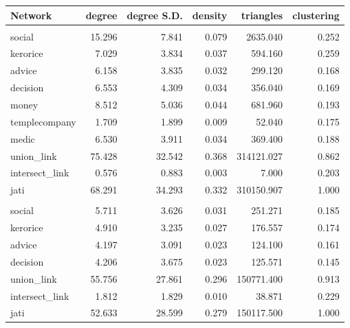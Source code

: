 
\begin{tabular}[t]{lrrrrr}
\toprule
Network & degree & degree S.D. & density & triangles & clustering\\
\midrule
\addlinespace[0.3em]
\hline
\multicolumn{6}{l}{\textbf{Microfinance villages}}\\
\hline
\hspace{1em}social & 15.296 & 7.841 & 0.079 & 2635.040 & 0.252\\
\hspace{1em}kerorice & 7.029 & 3.834 & 0.037 & 594.160 & 0.259\\
\hspace{1em}advice & 6.158 & 3.835 & 0.032 & 299.120 & 0.168\\
\hspace{1em}decision & 6.553 & 4.309 & 0.034 & 356.040 & 0.169\\
\hspace{1em}money & 8.512 & 5.036 & 0.044 & 681.960 & 0.193\\
\hspace{1em}templecompany & 1.709 & 1.899 & 0.009 & 52.040 & 0.175\\
\hspace{1em}medic & 6.530 & 3.911 & 0.034 & 369.400 & 0.188\\
\hspace{1em}union\_link & 75.428 & 32.542 & 0.368 & 314121.027 & 0.862\\
\hspace{1em}intersect\_link & 0.576 & 0.883 & 0.003 & 7.000 & 0.203\\
\hspace{1em}jati & 68.291 & 34.293 & 0.332 & 310150.907 & 1.000\\
\addlinespace[0.3em]
\hline
\multicolumn{6}{l}{\textbf{RCT villages}}\\
\hline
\hspace{1em}social & 5.711 & 3.626 & 0.031 & 251.271 & 0.185\\
\hspace{1em}kerorice & 4.910 & 3.235 & 0.027 & 176.557 & 0.174\\
\hspace{1em}advice & 4.197 & 3.091 & 0.023 & 124.100 & 0.161\\
\hspace{1em}decision & 4.206 & 3.675 & 0.023 & 125.571 & 0.145\\
\hspace{1em}union\_link & 55.756 & 27.861 & 0.296 & 150771.400 & 0.913\\
\hspace{1em}intersect\_link & 1.812 & 1.829 & 0.010 & 38.871 & 0.229\\
\hspace{1em}jati & 52.633 & 28.599 & 0.279 & 150117.500 & 1.000\\
\bottomrule
\end{tabular}
